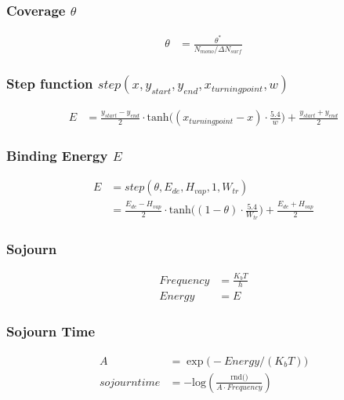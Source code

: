 \subsubsection*{Coverage $\theta$}
\begin{equation}
	\label{eq:cov}
	\begin{split}
		\theta&=\frac{\theta^*}{N_{mono}/\Delta N_{surf}}
	\end{split}
\end{equation}

\subsubsection*{Step function $step(x, y_{start}, y_{end}, x_{turning point}, w)$}
\begin{equation}
	\label{eq:stepfct}
	\begin{split}
		E&=\frac{y_{start}-y_{end}}{2} \cdot \text{tanh}\Big((x_{turning point}-x) \cdot \frac{5.4}{w}\Big) + \frac{y_{start}+y_{end}}{2}
	\end{split}
\end{equation}

\subsubsection*{Binding Energy $E$}
\begin{equation}
	\label{eq:energy}
	\begin{split}
		E&= step(\theta, E_{de}, H_{vap}, 1, W_{tr})\\
		&=\frac{E_{de}-H_{vap}}{2} \cdot \text{tanh}\Big((1-\theta) \cdot \frac{5.4}{W_{tr}}\Big) + \frac{E_{de}+H_{vap}}{2}
	\end{split}
\end{equation}

\subsubsection*{Sojourn}
\begin{equation}
	\label{eq:sojourn}
	\begin{split}
		Frequency&=\frac{K_b T}{h}\\
		Energy&= E
	\end{split}
\end{equation}


\subsubsection*{Sojourn Time}
\begin{equation}
	\label{eq:sojourntime}
	\begin{split}
		A&=\exp\Big( - Energy/(K_b T)\big)\\
		sojourn time&= -\text{log}(\frac{\text{rnd()}}{A \cdot Frequency})
	\end{split}
\end{equation}

